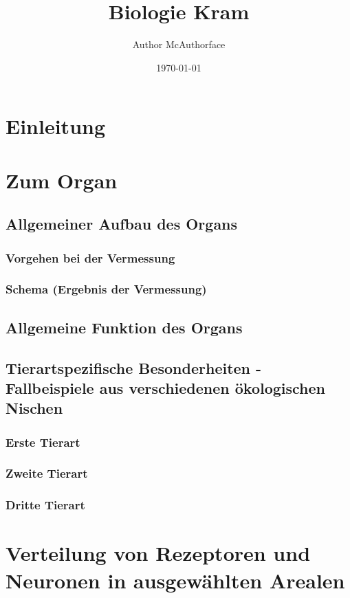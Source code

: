 \documentclass[11pt,a4paper]{scrartcl}
\title{Biologie Kram}
\date{\today}
\author{Author McAuthorface}
\newcommand{\setpageno}[1]{%
    \setcounter{page}{#1}
    \newpage
}
\begin{document}
\maketitle
\thispagestyle{empty}
\newpage

\tableofcontents
\thispagestyle{empty}
\newpage

\section{Einleitung}
\setpageno{1}

\section{Zum Organ}
\subsection{Allgemeiner Aufbau des Organs}
\subsubsection{Vorgehen bei der Vermessung}
\setpageno{2}
\subsubsection{Schema (Ergebnis der Vermessung)}
\subsection{Allgemeine Funktion des Organs}
\setpageno{5}
\subsection{Tierartspezifische Besonderheiten - Fallbeispiele aus verschiedenen ökologischen Nischen}
\subsubsection{Erste Tierart}
\setpageno{7}
\subsubsection{Zweite Tierart}
\setpageno{8}
\subsubsection{Dritte Tierart}
\setpageno{9}

\section{Verteilung von Rezeptoren und Neuronen in ausgewählten Arealen}
\setpageno{10}
\end{document}
